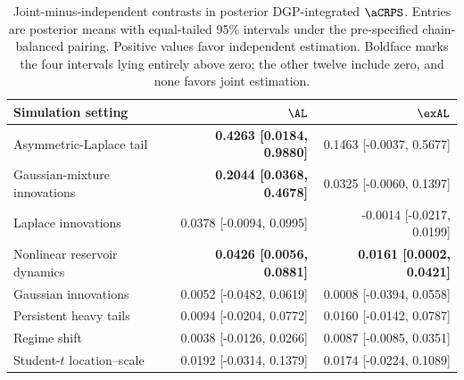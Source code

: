 \begin{table}[!htbp]
\centering
\scriptsize
\begin{tabular}{@{}>{\raggedright\arraybackslash}p{}rr@{}}
\toprule
Simulation setting & \(\AL\) & \(\exAL\) \\
\midrule
Asymmetric-Laplace tail & \textbf{0.4263 [0.0184, 0.9880]} & 0.1463 [-0.0037, 0.5677] \\
Gaussian-mixture innovations & \textbf{0.2044 [0.0368, 0.4678]} & 0.0325 [-0.0060, 0.1397] \\
Laplace innovations & 0.0378 [-0.0094, 0.0995] & -0.0014 [-0.0217, 0.0199] \\
Nonlinear reservoir dynamics & \textbf{0.0426 [0.0056, 0.0881]} & \textbf{0.0161 [0.0002, 0.0421]} \\
Gaussian innovations & 0.0052 [-0.0482, 0.0619] & 0.0008 [-0.0394, 0.0558] \\
Persistent heavy tails & 0.0094 [-0.0204, 0.0772] & 0.0160 [-0.0142, 0.0787] \\
Regime shift & 0.0038 [-0.0126, 0.0266] & 0.0087 [-0.0085, 0.0351] \\
Student-\(t\) location--scale & 0.0192 [-0.0314, 0.1379] & 0.0174 [-0.0224, 0.1089] \\
\bottomrule
\end{tabular}
\caption{Joint-minus-independent contrasts in posterior DGP-integrated \(\aCRPS\). Entries are posterior means with equal-tailed 95\% intervals under the pre-specified chain-balanced pairing. Positive values favor independent estimation. Boldface marks the four intervals lying entirely above zero; the other twelve include zero, and none favors joint estimation.}
\label{qdesn:tab:supp-joint-qdesn-corrected-v4-contrasts}
\end{table}
